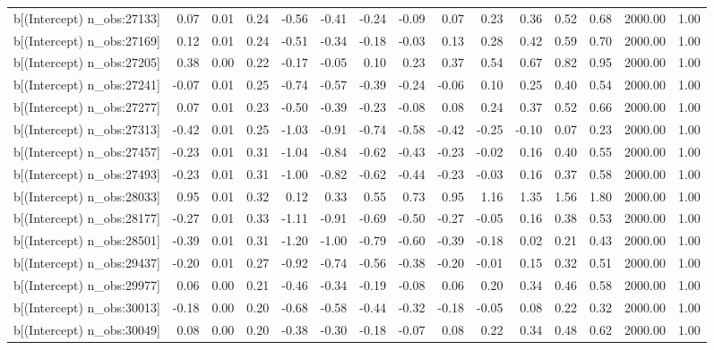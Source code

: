 \begin{table}[ht]
\begin{tabular}{rrrrrrrrrrrrrrr}
  b[(Intercept) n\_obs:27133] & 0.07 & 0.01 & 0.24 & -0.56 & -0.41 & -0.24 & -0.09 & 0.07 & 0.23 & 0.36 & 0.52 & 0.68 & 2000.00 & 1.00 \\ 
  b[(Intercept) n\_obs:27169] & 0.12 & 0.01 & 0.24 & -0.51 & -0.34 & -0.18 & -0.03 & 0.13 & 0.28 & 0.42 & 0.59 & 0.70 & 2000.00 & 1.00 \\ 
  b[(Intercept) n\_obs:27205] & 0.38 & 0.00 & 0.22 & -0.17 & -0.05 & 0.10 & 0.23 & 0.37 & 0.54 & 0.67 & 0.82 & 0.95 & 2000.00 & 1.00 \\ 
  b[(Intercept) n\_obs:27241] & -0.07 & 0.01 & 0.25 & -0.74 & -0.57 & -0.39 & -0.24 & -0.06 & 0.10 & 0.25 & 0.40 & 0.54 & 2000.00 & 1.00 \\ 
  b[(Intercept) n\_obs:27277] & 0.07 & 0.01 & 0.23 & -0.50 & -0.39 & -0.23 & -0.08 & 0.08 & 0.24 & 0.37 & 0.52 & 0.66 & 2000.00 & 1.00 \\ 
  b[(Intercept) n\_obs:27313] & -0.42 & 0.01 & 0.25 & -1.03 & -0.91 & -0.74 & -0.58 & -0.42 & -0.25 & -0.10 & 0.07 & 0.23 & 2000.00 & 1.00 \\ 
  b[(Intercept) n\_obs:27457] & -0.23 & 0.01 & 0.31 & -1.04 & -0.84 & -0.62 & -0.43 & -0.23 & -0.02 & 0.16 & 0.40 & 0.55 & 2000.00 & 1.00 \\ 
  b[(Intercept) n\_obs:27493] & -0.23 & 0.01 & 0.31 & -1.00 & -0.82 & -0.62 & -0.44 & -0.23 & -0.03 & 0.16 & 0.37 & 0.58 & 2000.00 & 1.00 \\ 
  b[(Intercept) n\_obs:28033] & 0.95 & 0.01 & 0.32 & 0.12 & 0.33 & 0.55 & 0.73 & 0.95 & 1.16 & 1.35 & 1.56 & 1.80 & 2000.00 & 1.00 \\ 
  b[(Intercept) n\_obs:28177] & -0.27 & 0.01 & 0.33 & -1.11 & -0.91 & -0.69 & -0.50 & -0.27 & -0.05 & 0.16 & 0.38 & 0.53 & 2000.00 & 1.00 \\ 
  b[(Intercept) n\_obs:28501] & -0.39 & 0.01 & 0.31 & -1.20 & -1.00 & -0.79 & -0.60 & -0.39 & -0.18 & 0.02 & 0.21 & 0.43 & 2000.00 & 1.00 \\ 
  b[(Intercept) n\_obs:29437] & -0.20 & 0.01 & 0.27 & -0.92 & -0.74 & -0.56 & -0.38 & -0.20 & -0.01 & 0.15 & 0.32 & 0.51 & 2000.00 & 1.00 \\ 
  b[(Intercept) n\_obs:29977] & 0.06 & 0.00 & 0.21 & -0.46 & -0.34 & -0.19 & -0.08 & 0.06 & 0.20 & 0.34 & 0.46 & 0.58 & 2000.00 & 1.00 \\ 
  b[(Intercept) n\_obs:30013] & -0.18 & 0.00 & 0.20 & -0.68 & -0.58 & -0.44 & -0.32 & -0.18 & -0.05 & 0.08 & 0.22 & 0.32 & 2000.00 & 1.00 \\ 
  b[(Intercept) n\_obs:30049] & 0.08 & 0.00 & 0.20 & -0.38 & -0.30 & -0.18 & -0.07 & 0.08 & 0.22 & 0.34 & 0.48 & 0.62 & 2000.00 & 1.00 \\ 

\end{tabular}
\end{table}
